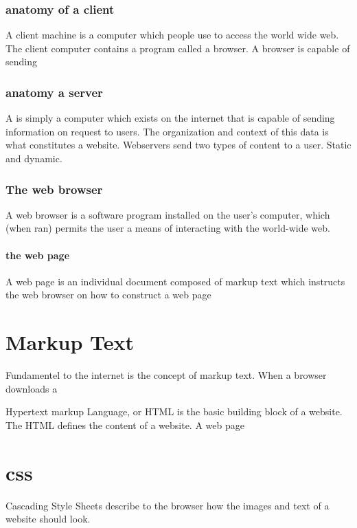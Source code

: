 \subsection{anatomy of a client}

A client machine is a computer which people use to access the world wide web.  The client computer contains a program called a browser.  A browser is capable of sending 

\subsection{anatomy a server}

A is simply a computer which exists on the internet that is capable of sending information on request to users.  The organization and context of this data is what constitutes a website.  Webservers send two types of content to a user.  Static and dynamic.

\subsection{The web browser}

A web browser is a software program installed on the user's computer, which (when ran) permits the user a means of interacting with the world-wide web.  


\subsubsection{the web page}

A web page is an individual document composed of markup text which instructs the web browser on how to construct a web page

\chapter{Markup Text}

Fundamentel to the internet is the concept of markup text.  When a browser downloads a 

Hypertext markup Language, or HTML is the basic building block of a website.  The HTML defines the content of a website.  A web page 

\chapter{css}

Cascading Style Sheets describe to the browser how the images and text of a website should look.  

